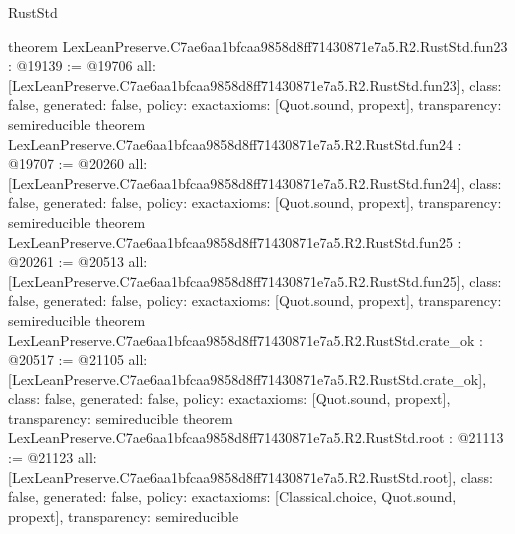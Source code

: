 \begin{lexlean}{RustStd}
\begin{coremodule}
{}
theorem LexLeanPreserve.C7ae6aa1bfcaa9858d8ff71430871e7a5.R2.RustStd.fun23 : @19139 := @19706 {
  all: [LexLeanPreserve.C7ae6aa1bfcaa9858d8ff71430871e7a5.R2.RustStd.fun23],
  class: false,
  generated: false,
  policy: exact{axioms: [Quot.sound, propext]},
  transparency: semireducible
}
theorem LexLeanPreserve.C7ae6aa1bfcaa9858d8ff71430871e7a5.R2.RustStd.fun24 : @19707 := @20260 {
  all: [LexLeanPreserve.C7ae6aa1bfcaa9858d8ff71430871e7a5.R2.RustStd.fun24],
  class: false,
  generated: false,
  policy: exact{axioms: [Quot.sound, propext]},
  transparency: semireducible
}
theorem LexLeanPreserve.C7ae6aa1bfcaa9858d8ff71430871e7a5.R2.RustStd.fun25 : @20261 := @20513 {
  all: [LexLeanPreserve.C7ae6aa1bfcaa9858d8ff71430871e7a5.R2.RustStd.fun25],
  class: false,
  generated: false,
  policy: exact{axioms: [Quot.sound, propext]},
  transparency: semireducible
}
theorem LexLeanPreserve.C7ae6aa1bfcaa9858d8ff71430871e7a5.R2.RustStd.crate_ok : @20517 := @21105 {
  all: [LexLeanPreserve.C7ae6aa1bfcaa9858d8ff71430871e7a5.R2.RustStd.crate_ok],
  class: false,
  generated: false,
  policy: exact{axioms: [Quot.sound, propext]},
  transparency: semireducible
}
theorem LexLeanPreserve.C7ae6aa1bfcaa9858d8ff71430871e7a5.R2.RustStd.root : @21113 := @21123 {
  all: [LexLeanPreserve.C7ae6aa1bfcaa9858d8ff71430871e7a5.R2.RustStd.root],
  class: false,
  generated: false,
  policy: exact{axioms: [Classical.choice, Quot.sound, propext]},
  transparency: semireducible
}


\end{coremodule}
\end{lexlean}
